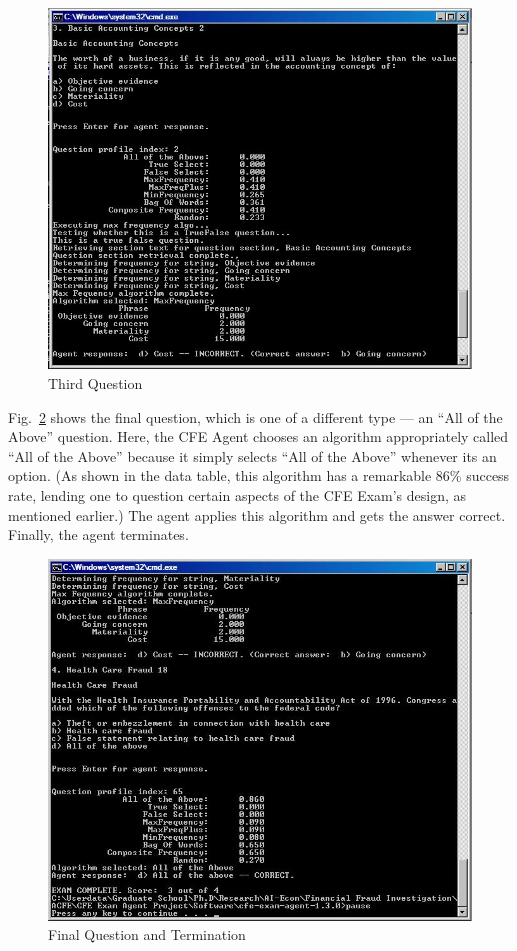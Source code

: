 \begin{figure}
\centering
\includegraphics[scale=0.75]{screen_shot_6.jpg}
\caption{Third Question}
\label{fig:third_question}
\end{figure}

Fig.~\ref{fig:final_question_and_termination} shows the final question, which is one of a different type --- an ``All of the Above'' question.  Here, the CFE Agent chooses an algorithm appropriately called ``All of the Above'' because it simply selects ``All of the Above'' whenever its an option.  (As shown in the data table, this algorithm has a remarkable 86\% success rate, lending one to question certain aspects of the CFE Exam’s design, as mentioned earlier.)  The agent applies this algorithm and gets the answer correct.  Finally, the agent terminates.

\begin{figure}
\centering
\includegraphics[scale=0.75]{screen_shot_7.jpg}
\caption{Final Question and Termination}
\label{fig:final_question_and_termination}
\end{figure}


